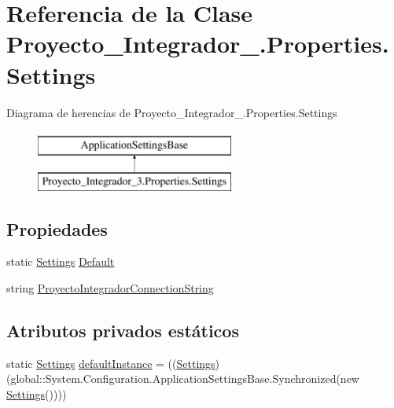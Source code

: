 \hypertarget{class_proyecto___integrador__3_1_1_properties_1_1_settings}{\section{Referencia de la Clase Proyecto\-\_\-\-Integrador\-\_.\-Properties.\-Settings}
\label{class_proyecto___integrador__3_1_1_properties_1_1_settings}
}
Diagrama de herencias de Proyecto\-\_\-\-Integrador\-\_.\-Properties.\-Settings\begin{figure}[H]
\begin{center}
\leavevmode
\includegraphics[height=2.000000cm]{class_proyecto___integrador__3_1_1_properties_1_1_settings}
\end{center}
\end{figure}
\subsection*{Propiedades}
\begin{DoxyCompactItemize}
\item 
static \hyperlink{class_proyecto___integrador__3_1_1_properties_1_1_settings}{Settings} \hyperlink{class_proyecto___integrador__3_1_1_properties_1_1_settings_ac74497e82c6360793c1eb24ddce6e7b1}{Default}
\item 
string \hyperlink{class_proyecto___integrador__3_1_1_properties_1_1_settings_a93d1b331cecd6df496d20e46ec32450d}{Proyecto\-Integrador\-Connection\-String}
\end{DoxyCompactItemize}
\subsection*{Atributos privados estáticos}
\begin{DoxyCompactItemize}
\item 
static \hyperlink{class_proyecto___integrador__3_1_1_properties_1_1_settings}{Settings} \hyperlink{class_proyecto___integrador__3_1_1_properties_1_1_settings_a0506f261ec13f63859843f202056c917}{default\-Instance} = ((\hyperlink{class_proyecto___integrador__3_1_1_properties_1_1_settings}{Settings})(global\-::\-System.\-Configuration.\-Application\-Settings\-Base.\-Synchronized(new \hyperlink{class_proyecto___integrador__3_1_1_properties_1_1_settings}{Settings}())))
\end{DoxyCompactItemize}


